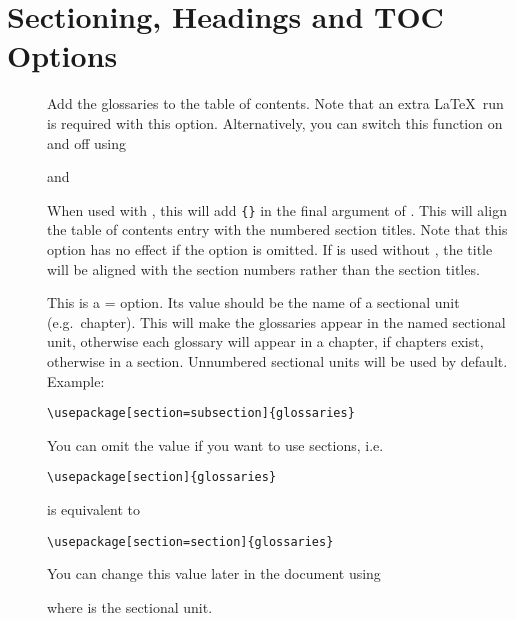 \documentclass[report,inlinetitle]{nlctdoc}
\begin{document}
\section{Sectioning, Headings and TOC Options}
\label{sec:pkgopts-sec}

\begin{description}
\item[] Add the glossaries to the table of contents.
Note that an extra \LaTeX\ run is required with this option.
Alternatively, you can switch this function on and off using
\begin{definition}[\DescribeMacro{\glstoctrue}]
\end{definition}
and
\begin{definition}[\DescribeMacro{\glstocfalse}]
\end{definition}

\item[] When used with , this will
add \verb|{}| in the final argument of 
. This will align the table of contents entry 
with the numbered section titles. Note that this option has no
effect if the  option is omitted. If  is
used without , the title will be aligned with
the section numbers rather than the section titles.

\item[] This is a = option.  Its
value should be the name of a sectional unit (e.g.\ chapter).
This will make the glossaries appear in the named sectional unit,
otherwise each glossary will appear in a chapter, if chapters
exist, otherwise in a section. Unnumbered sectional units will be used
by default. Example:
\begin{verbatim}
\usepackage[section=subsection]{glossaries}
\end{verbatim}
You can omit the value if you want to use sections, i.e.\
\begin{verbatim}
\usepackage[section]{glossaries}
\end{verbatim}
is equivalent to
\begin{verbatim}
\usepackage[section=section]{glossaries}
\end{verbatim}
You can change this value later in the document using
\begin{definition}[\DescribeMacro{\setglossarysection}]
\end{definition}
where  is the sectional unit.


\end{description}
\end{document}
